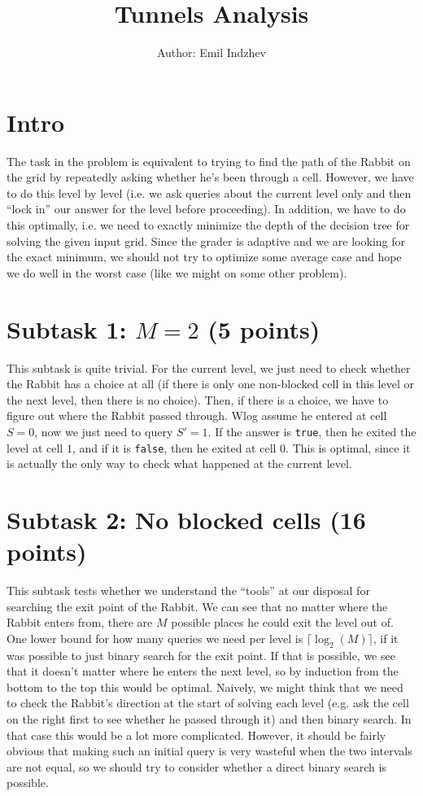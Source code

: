 \documentclass[12pt]{article}
\title{Tunnels Analysis}
\author{Author: Emil Indzhev}
\date{}
\begin{document}
\maketitle

\section*{Intro}

The task in the problem is equivalent to trying to find the path of the Rabbit on the grid by repeatedly asking whether he's been through a cell. However, we have to do this level by level (i.e. we ask queries about the current level only and then ``lock in'' our answer for the level before proceeding). In addition, we have to do this optimally, i.e. we need to exactly minimize the depth of the decision tree for solving the given input grid. Since the grader is adaptive and we are looking for the exact minimum, we should not try to optimize some average case and hope we do well in the worst case (like we might on some other problem).

\section*{Subtask 1: $M = 2$ (5 points)}

This subtask is quite trivial. For the current level, we just need to check whether the Rabbit has a choice at all (if there is only one non-blocked cell in this level or the next level, then there is no choice). Then, if there is a choice, we have to figure out where the Rabbit passed through. Wlog assume he entered at cell $S = 0$, now we just need to query $S' = 1$. If the answer is \verb|true|, then he exited the level at cell $1$, and if it is \verb|false|, then he exited at cell $0$. This is optimal, since it is actually the only way to check what happened at the current level.

\section*{Subtask 2: No blocked cells (16 points)}

This subtask tests whether we understand the ``tools'' at our disposal for searching the exit point of the Rabbit. We can see that no matter where the Rabbit enters from, there are $M$ possible places he could exit the level out of. One lower bound for how many queries we need per level is $\lceil \log_2(M) \rceil$, if it was possible to just binary search for the exit point. If that is possible, we see that it doesn't matter where he enters the next level, so by induction from the bottom to the top this would be optimal. Naively, we might think that we need to check the Rabbit's direction at the start of solving each level (e.g. ask the cell on the right first to see whether he passed through it) and then binary search. In that case this would be a lot more complicated. However, it should be fairly obvious that making such an initial query is very wasteful when the two intervals are not equal, so we should try to consider whether a direct binary search is possible.
\end{document}
